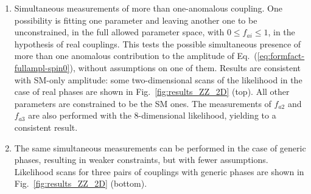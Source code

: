 \begin{enumerate}
  \item Simultaneous measurements of more than one-anomalous coupling.
    One possibility is fitting one parameter and leaving another one
    to be unconstrained, in the full allowed parameter space, with
    $0\le f_{ai}\le 1$, in the hypothesis of real couplings. This
    tests the possible simultaneous presence of more than one
    anomalous contribution to the amplitude of
    Eq.~(\ref{eq:formfact-fullampl-spin0}), without assumptions on one
    of them. Results are consistent with SM-only amplitude: some
    two-dimensional scans of the likelihood in the case of real phases
    are shown in Fig.~\ref{fig:results_ZZ_2D} (top). All other
    parameters are constrained to be the SM ones. The measurements of
    $f_{a2}$ and $f_{a3}$ are also performed with the 8-dimensional
    likelihood, yielding to a consistent result.
\item The same simultaneous measurements can be performed in the case
  of generic phases, resulting in weaker constraints, but with fewer
  assumptions. Likelihood scans for three pairs of couplings with
  generic phases are shown in Fig.~\ref{fig:results_ZZ_2D} (bottom).


\end{enumerate}
